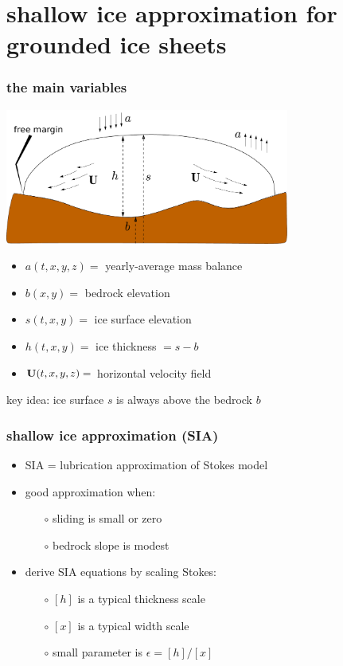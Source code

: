 \documentclass{beamer}
\newcommand{\eps}{\epsilon}
\begin{document}
\section[shallow ice approximation]{shallow ice approximation for grounded ice sheets}


\begin{frame}
  \frametitle{the main variables}

\begin{center}
\includegraphics[width=0.7\textwidth]{groundedscheme}
\end{center}

\begin{itemize}
\small
\item $a(t,x,y,z)=$ yearly-average mass balance
\item $b(x,y)=$ bedrock elevation
\item $s(t,x,y)=$ ice surface elevation
\item $h(t,x,y)=$ ice thickness $ = s-b$
\item ${\bf U}(t,x,y,z)=$ horizontal velocity field
\end{itemize}

\begin{alertblock}{key idea: ice surface $s$ is always above the bedrock $b$}
\end{alertblock}
\end{frame}


\begin{frame}
  \frametitle{shallow ice approximation (SIA)}

\begin{itemize}
\item SIA = lubrication approximation of Stokes model
\item good approximation when:
  \begin{itemize}
  \item[$\circ$] sliding is small or zero
  \item[$\circ$] bedrock slope is modest
  \end{itemize}
\item derive SIA equations by scaling Stokes:
  \begin{itemize}
  \item[$\circ$] $[h]$ is a typical thickness scale
  \item[$\circ$] $[x]$ is a typical width scale
  \item[$\circ$] small parameter is $\eps = [h] / [x]$
  \end{itemize}
\end{itemize}
\end{frame}
\end{document}
